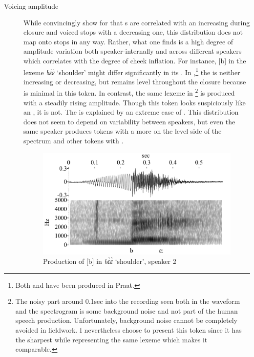 \documentclass[output=paper]{LSP/langsci}
\begin{document}
\begin{description}
\item[Voicing amplitude] While \citet{Nagano2012} convincingly show for  that s are correlated with an increasing  during closure and voiced stops with a decreasing one, this distribution does not map onto  stops in any way. Rather, what one finds is a high degree of amplitude variation both speaker-internally and across different speakers which correlates with the degree of cheek inflation.  For instance, [b] in the lexeme {\it bɛ̀ɛ̀} `shoulder' might differ significantly in its . In ,\footnote{Both  and  have been produced in Praat.} the  is neither increasing or decreasing, but remains level throughout the closure because  is minimal in this token. In contrast, the same lexeme in \footnote{The noisy part around 0.1sec into the recording seen both in the waveform and the spectrogram is some background noise and not part of the human speech production. Unfortunately, background noise cannot be completely avoided in fieldwork. I nevertheless choose to present this token since it has the sharpest  while representing the same lexeme which makes it comparable.} is produced with a steadily rising amplitude. Though this token looks suspiciously like an , it is not. The  is explained by an extreme case of .   This distribution does not seem to depend on variability between speakers, but even the same speaker produces tokens with a  more on the level side of the spectrum and other tokens with .

\begin{figure}
\caption{ Production of [b] in {\it bɛ̀ɛ̀} `shoulder', speaker 2}
\label{fig:grimm:3}
\begin{center}
\includegraphics[width=\textwidth]{figures/GyeliB-Mama-mini.jpg}
\end{center}
\end{figure}


\end{description}
\end{document}
